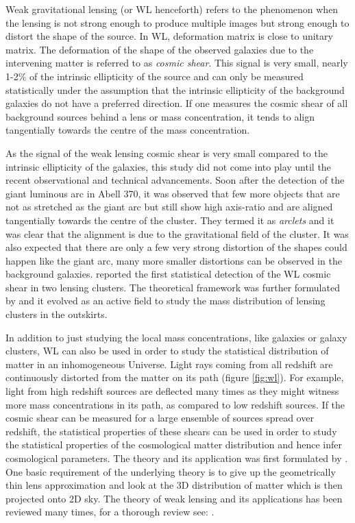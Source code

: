 \documentclass[
  11pt,
  twoside,
  openright,
  titlepage,
  headings=optiontoheadandtoc
]{scrbook}
\begin{document}
Weak gravitational lensing (or WL henceforth) refers to the phenomenon when 
the lensing is not strong enough to produce multiple images but strong enough
to distort the shape of the source. In WL, deformation matrix is close
to unitary matrix.
The deformation of the shape of the observed galaxies
due to the intervening matter is referred to as {\it cosmic shear}. This
signal is very small, nearly 1-2$\%$ of the intrinsic ellipticity of the source 
and can only be measured statistically under the assumption that the intrinsic 
ellipticity of the background galaxies do not have a preferred direction. If one 
measures the cosmic shear of all background sources behind a lens or mass concentration,
it tends to align tangentially towards the centre of the mass concentration. 

As the signal of the weak lensing cosmic shear is very small compared to the 
intrinsic ellipticity of the galaxies, this study did not come into play until
the recent observational and technical advancements. Soon 
after the detection of the giant luminous arc in Abell 370, it was observed
that few more objects that are not as stretched as the giant arc but still show
high axis-ratio and are aligned tangentially towards the centre of the cluster. They
termed it as {\it arclets} and it was clear that the alignment is due to the 
gravitational field of the cluster. It was also expected that there are
only a few very strong distortion of the shapes could happen like the giant 
arc, many more smaller distortions can be observed in the background galaxies.
\cite{1990ApJ...349L...1T} reported the first statistical detection of the WL
cosmic shear in two lensing clusters. The theoretical framework was further
formulated by \cite{1993ApJ...404..441K} and it evolved as an active field
to study the mass distribution of lensing clusters in the outskirts. 

In addition to just studying the local mass concentrations, like galaxies or galaxy
clusters, WL can also be used in order to study the statistical distribution of matter
in an inhomogeneous Universe. Light rays coming from all redshift are continuously
distorted from the matter on its path (figure \ref{fig:wl}). 
For example, light from high redshift sources
are deflected many times as they might witness more mass concentrations in its path, 
as compared to low redshift sources. If the cosmic shear can be measured for 
a large ensemble of sources spread over redshift, the statistical properties
of these shears can be used in order to study the statistical properties of the
cosmological matter distribution and hence infer cosmological parameters. The 
theory and its application was first formulated by \cite{1991MNRAS.251..600B}.
One basic requirement of the underlying theory is to give up the geometrically
thin lens approximation and look at the 3D distribution of matter which 
is then projected onto 2D sky. The theory of weak lensing and its applications
has been reviewed many times, for a thorough review see: \cite{2001stgl.book.....P}.
\end{document}
